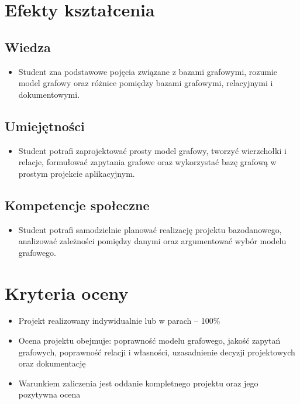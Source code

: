 \documentclass[12pt, a4paper]{article}
\begin{document}
\section{Efekty kształcenia}

\subsection*{Wiedza}
\begin{itemize}
  \item Student zna podstawowe pojęcia związane z bazami grafowymi, rozumie model grafowy oraz różnice pomiędzy bazami grafowymi, relacyjnymi i dokumentowymi.
\end{itemize}

\subsection*{Umiejętności}
\begin{itemize}
  \item Student potrafi zaprojektować prosty model grafowy, tworzyć wierzchołki i relacje, formułować zapytania grafowe oraz wykorzystać bazę grafową w prostym projekcie aplikacyjnym.
\end{itemize}

\subsection*{Kompetencje społeczne}
\begin{itemize}
  \item Student potrafi samodzielnie planować realizację projektu bazodanowego, analizować zależności pomiędzy danymi oraz argumentować wybór modelu grafowego.
\end{itemize}

\section{Kryteria oceny}

\begin{itemize}
  \item Projekt realizowany indywidualnie lub w parach – 100\%
  \item Ocena projektu obejmuje: poprawność modelu grafowego, jakość zapytań grafowych, poprawność relacji i własności, uzasadnienie decyzji projektowych oraz dokumentację
  \item Warunkiem zaliczenia jest oddanie kompletnego projektu oraz jego pozytywna ocena
\end{itemize}
\end{document}
